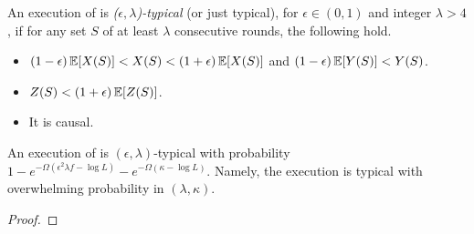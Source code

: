 \begin{definition}
  An execution of \poem is \emph{($\epsilon,\lambda$)-typical} (or just typical),
  for $\epsilon \in (0,1)$ and integer $\lambda > 4$, if for any set $S$ of at
  least $\lambda$ consecutive rounds, the following hold.
  \begin{itemize}
    \item $(1 - \epsilon) \mathop{{}\mathbb{E}}[X(S)] < X(S) < (1 + \epsilon) \mathop{{}\mathbb{E}}[X(S)]$ and $(1-\epsilon) \mathop{{}\mathbb{E}}[Y(S)] < Y(S)$.
    \item $Z(S) < (1 + \epsilon)\mathop{{}\mathbb{E}}[Z(S)]$.
    \item It is causal.
  \end{itemize}
\end{definition}

\begin{theorem}[Typicality]
  An execution of \poem is $(\epsilon, \lambda)$-typical with
  probability $1 - e^{-\Omega(\epsilon^2\lambda f - \log L)} - e^{-\Omega(\kappa - \log L)}$.
  Namely, the execution is typical with overwhelming probability in $(\lambda, \kappa)$.
\end{theorem}
\begin{proof}
\end{proof}

